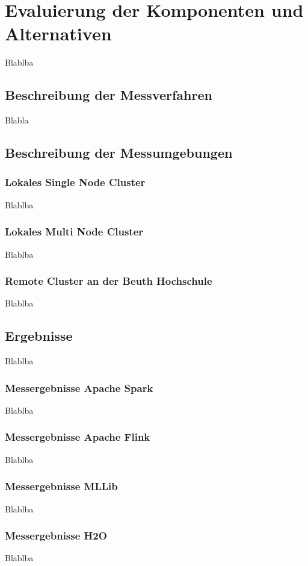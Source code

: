 \chapter{Evaluierung der Komponenten und Alternativen }
\label{chapter:evaluierung}



Blablba

\section{Beschreibung der Messverfahren}
\label{section:messumgebungen}

Blabla


\section{Beschreibung der Messumgebungen}
\label{section:messumgebungen}

\subsection{Lokales Single Node Cluster  }
\label{section:lokales single node}

Blablba

\subsection{Lokales Multi Node Cluster}
\label{section:tachyon}

Blablba

\subsection{Remote Cluster an der Beuth Hochschule}
\label{section:remote}

Blablba

\section{Ergebnisse}
\label{section:ergebnisse}

Blablba

\subsection{Messergebnisse Apache Spark}
\label{section:spark eval}

Blablba

\subsection{Messergebnisse Apache Flink}
\label{section:mllib arch}

Blablba

\subsection{Messergebnisse MLLib}
\label{section:mllib arch}

Blablba

\subsection{Messergebnisse H2O}
\label{section:mllib arch}

Blablba

